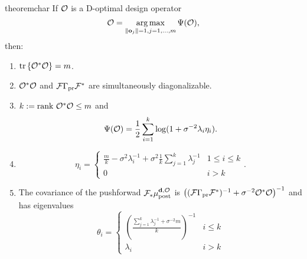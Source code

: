 \begin{restatable}{theorem}{char}
  If $\mathcal{O}$ is a D-optimal design operator
    \begin{equation*}
      \obs = \argmax_{\|\meas_j\| = 1, j=1,\dots,m}\tar(\obs), 
    \end{equation*}
    then:
  \begin{enumerate}
  \item  $\textup{tr}\left \{\mathcal{O}^*\mathcal{O} \right \} = m$.
  \item $\mathcal{O}^*\mathcal{O}$ and $\mathcal{F}\Gamma_{\textup{pr}}\mathcal{F}^*$ are simultaneously
    diagonalizable.
  \item $k := \textup{rank}\  \mathcal{O}^*\mathcal{O} \leq m$ and
    \begin{equation*}
      \tar(\obs) = \frac12 \sum_{i=1}^{k} \log (1 + \sigma^{-2}\lambda_i\eta_i). %
    \end{equation*}
  \item
    \begin{equation*}
        \eta_i = \begin{cases}
          \frac{m}{k} - \sigma^2 \lambda_i^{-1} + \sigma^2 \frac{1}{k} \sum_{j=1}^k \lambda_j^{-1} & 1 \leq i \leq k \\
          0 & i > k 
        \end{cases}.
    \end{equation*}
  \item The covariance of the pushforwad $\mathcal{F}_{*} \mu_{\textup{post}}^{\mathbf{d}, \mathcal{O}}$ is $\left (
    (\mathcal{F} \Gamma_{\textup{pr}} \mathcal{F}^*)^{-1} + \sigma^{-2} \mathcal{O}^*\mathcal{O} \right )^{-1}$
    and has eigenvalues
    \begin{equation*}
      \theta_i =
      \begin{cases}
        \left(\frac{\sum_{j=1}^k \lambda_j^{-1} + \sigma^{-2}m}{k} \right )^{-1} & i \leq k \\
        \lambda_i &  i > k 
      \end{cases}
    \end{equation*}
  \end{enumerate}
\end{restatable}


